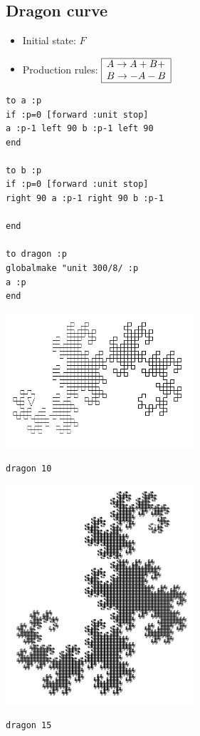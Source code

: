 \subsection{Dragon curve}
\begin{itemize}
 \item[\textbullet] Initial state: $F$\\
 \item[\textbullet] Production rules: $\begin{array}{|l|}
\hline
A\rightarrow A+B+ \\
B\rightarrow -A-B \\
\hline
\end{array}$ 
\end{itemize}
\begin{verbatim}
to a :p
if :p=0 [forward :unit stop]
a :p-1 left 90 b :p-1 left 90
end

to b :p
if :p=0 [forward :unit stop]
right 90 a :p-1 right 90 b :p-1

end

to dragon :p
globalmake "unit 300/8/ :p  
a :p
end
\end{verbatim}
\begin{center}
 \begin{minipage}{7cm}
 \includegraphics[width=7cm]{pics/linden-dragon10.png}
 \begin{center}
  \texttt{dragon 10}
 \end{center}
\end{minipage}
 \begin{minipage}{7cm}
 \includegraphics[width=7cm]{pics/linden-dragon15.png}
 \begin{center}
  \texttt{dragon 15}
 \end{center}
\end{minipage}
\end{center}

